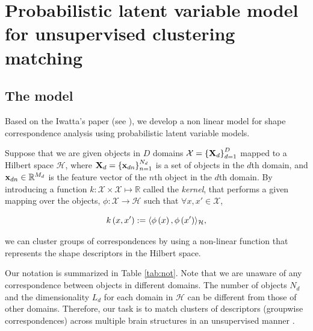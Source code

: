 \chapter[Probabilistic Correspondence Analysis]{Probabilistic latent variable model for unsupervised clustering matching}

\section{The model}

Based on the Iwatta's paper (see \cite{Iwata13,Iwata16}), we develop a non linear model for shape correspondence analysis using probabilistic latent variable models.

Suppose that we are given objects in $D$ domains $\mathcal{X}=\left\{\mathbf{X}_d\right\}_{d=1}^D$ mapped to a Hilbert space $\mathcal{H}$, where $\mathbf{X}_d = \left\{\mathbf{x}_{dn}\right\}_{n=1}^{N_d}$ is a set of objects in the $d$th domain, and $\mathbf{x}_{dn} \in \mathbb{R}^{M_d}$ is  the feature vector of the $n$th object in the $d$th domain. By introducing a function $k:\mathcal{X}\times\mathcal{X}\mapsto \mathbb{R}$ called the \textit{kernel}, that performs a given mapping over the objects, $\phi : \mathcal{X}\to\mathcal{H}$ such that $\forall x,x' \in \mathcal{X}$,

\begin{equation}
k\left(x,x'\right) := \langle\phi\left(x\right),\phi\left(x'\right)\rangle_{\mathcal{H}},
\end{equation}

we can cluster groups of correspondences by using a non-linear function that represents the shape descriptors in the Hilbert space.

Our notation is summarized in Table \ref{tab:not}. Note that we are unaware of any correspondence between objects in different domains. The number of objects $N_d$ and the dimensionality $L_d$ for each domain in $\mathcal{H}$ can be different from those of other domains.  Therefore, our task is to match clusters of descriptors (groupwise correspondences) across multiple brain structures in an
unsupervised manner \cite{Iwata16}.

